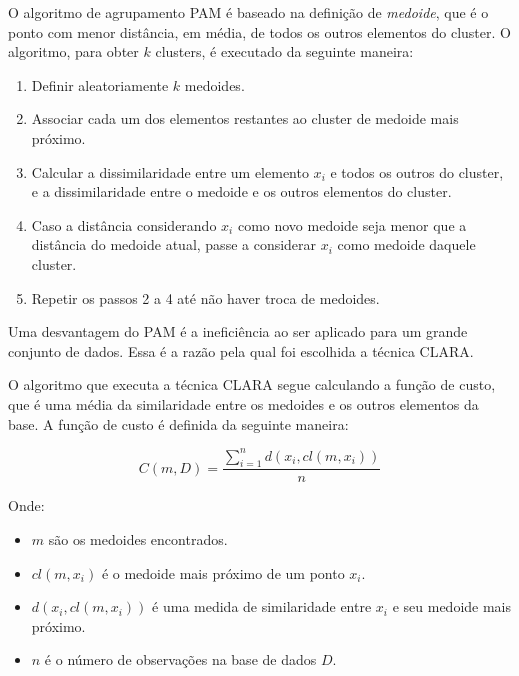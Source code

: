 \documentclass[12pt,a4paper,header]{abnt}
\begin{document}
O algoritmo de agrupamento PAM é baseado na definição de \textit{medoide}, que é o ponto com menor distância, em média, de todos os outros elementos do cluster. O algoritmo, para obter $k$ clusters, é executado da seguinte maneira\cite{do2005agrupamentos}:

\begin{enumerate}

\item{Definir aleatoriamente $k$ medoides.}
\item{Associar cada um dos elementos restantes ao cluster de medoide mais próximo.}
\item{Calcular a dissimilaridade entre um elemento $x_i$ e todos os outros do cluster, e a dissimilaridade entre o medoide e os outros elementos do cluster.}
\item{Caso a distância considerando $x_i$ como novo medoide seja menor que a distância do medoide atual, passe a considerar $x_i$ como medoide daquele cluster.}
\item{Repetir os passos 2 a 4 até não haver troca de medoides.}

\end{enumerate}

Uma desvantagem do PAM é a ineficiência ao ser aplicado para um grande conjunto de dados\cite{park2009simple}. Essa é a razão pela qual foi escolhida a técnica CLARA.

O algoritmo que executa a técnica CLARA segue calculando a função de custo, que é uma média da similaridade entre os medoides e os outros elementos da base\cite{bhat2014k}. A função de custo é definida da seguinte maneira:

\begin{equation}
C(m, D) = \frac{\sum_{i=1}^{n}{d(x_i, cl(m, x_i))}}{n}
\end{equation}

Onde:

\begin{itemize}

\item{$m$ são os medoides encontrados.}
\item{$cl(m,  x_i)$ é o medoide mais próximo de um ponto $x_i$.}
\item{$d(x_i, cl(m, x_i))$ é uma medida de similaridade entre $x_i$ e seu medoide mais próximo.}
\item{$n$ é o número de observações na base de dados $D$.}

\end{itemize}
\end{document}
